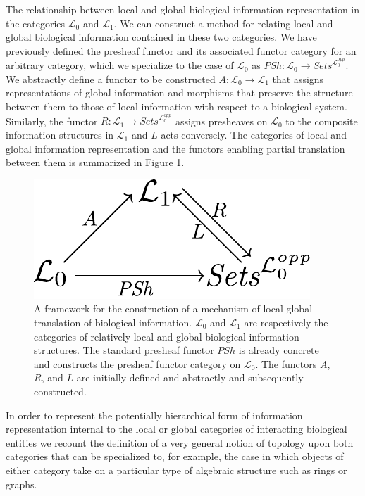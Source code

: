 \documentclass[aps,twocolumn]{revtex4-1}
\begin{document}

The relationship between local and global biological information representation in the categories $\mathcal{L}_0$ and $\mathcal{L}_1$. We can construct a method for relating local and global biological information contained in these two categories. We have previously defined the presheaf functor and its associated functor category for an arbitrary category, which we specialize to the case of $\mathcal{L}_0$ as $PSh: \mathcal{L}_0 \rightarrow \textit{Sets}^{\mathcal{L}_0^{opp}}$. We abstractly define a functor to be constructed $A:\mathcal{L}_0 \rightarrow \mathcal{L}_1$ that assigns representations of global information and morphisms that preserve the structure between them to those of local information with respect to a biological system.  Similarly, the functor $R: \mathcal{L}_1 \rightarrow \textit{Sets}^{\mathcal{L}_0^{opp}}$ assigns presheaves on $\mathcal{L}_0$ to the composite information structures in $\mathcal{L}_1$ and $L$ acts conversely. The categories of local and global information representation and the functors enabling partial translation between them is summarized in Figure \ref{fig:ascent}.

\begin{figure}
\noindent\includegraphics[width=0.5\columnwidth]{fig/ascent.pdf}
\caption{A framework for the construction of a mechanism of local-global translation of biological information. $\mathcal{L}_0$ and $\mathcal{L}_1$ are respectively the categories of relatively local and global biological information structures. The standard presheaf functor $PSh$ is already concrete and constructs the presheaf functor category on $\mathcal{L}_0$. The functors $A$, $R$, and $L$ are initially defined and abstractly and subsequently constructed.}
\label{fig:ascent}
\end{figure}

In order to represent the potentially hierarchical form of information representation internal to the local or global categories of interacting biological entities we recount the definition of a very general notion of topology upon both categories that can be specialized to, for example, the case in which objects of either category take on a particular type of algebraic structure such as rings or graphs.
\end{document}
